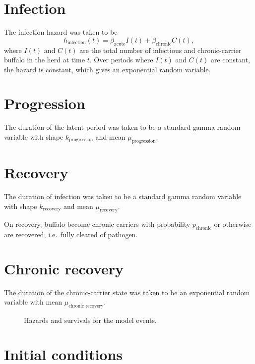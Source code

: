 \documentclass[12pt]{article}
\begin{document}
\section{Infection}

The infection hazard was taken to be
\begin{equation}
  h_{\text{infection}}(t) = \beta_{\text{acute}} I(t) +
  \beta_{\text{chronic}} C(t),
\end{equation}
where $I(t)$ and $C(t)$ are the total number of infectious and
chronic-carrier buffalo in the herd at time $t$.  Over periods where
$I(t)$ and $C(t)$ are constant, the hazard is constant, which gives an
exponential random variable.


\section{Progression}

The duration of the latent period was taken to be a standard gamma
random variable with shape $k_{\text{progression}}$
and mean $\mu_{\text{progression}}$.


\section{Recovery}

The duration of infection was taken to be a standard gamma random
variable with shape $k_{\text{recovery}}$ and mean
$\mu_{\text{recovery}}$.

On recovery, buffalo become chronic carriers with probability
$p_{\text{chronic}}$ or otherwise are recovered, i.e.~fully cleared
of pathogen.


\section{Chronic recovery}

The duration of the chronic-carrier state was taken to be an
exponential random variable with mean
$\mu_{\text{chronic recovery}}$.


\begin{figure}
  \centering
  \begin{sansmath}
    
  \end{sansmath}
  \caption{Hazards and survivals for the model events.}
  \label{fig:distributions}
\end{figure}


\section{Initial conditions}
\end{document}
